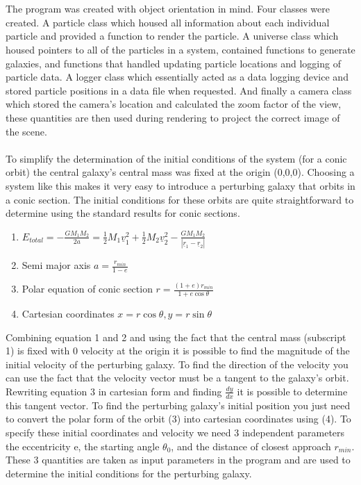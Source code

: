 \documentclass[10pt,a4paper]{article}
\begin{document}
\\
\\
The program was created with object orientation in mind. Four classes were created. A particle class which housed all information about each individual particle and provided a function to render the particle. A universe class which housed pointers to all of the particles in a system, contained functions to generate galaxies, and functions that handled updating particle locations and logging of particle data. A logger class which essentially acted as a data logging device and stored particle positions in a data file when requested. And finally a camera class which stored the camera's location and calculated the zoom factor of the view, these quantities are then used during rendering to project the correct image of the scene.
\\
\\
To simplify the determination of the initial conditions of the system (for a conic orbit) the central galaxy's central mass was fixed at the origin (0,0,0). Choosing a system like this makes it very easy to introduce a perturbing galaxy that orbits in a conic section. The initial conditions for these orbits are quite straightforward to determine using the standard results for conic sections.

\begin{enumerate}
\item $E_{total} = -\frac{G M_1 M_2}{2 a} =\frac{1}{2} M_1 \underline{v}_1^2 + \frac{1}{2} M_2 \underline{v}_2^2 -\frac{G M_1 M_2}{|\underline{r}_1-\underline{r}_2|}$
\item Semi major axis $a = \frac{r_{min}}{1-e}$
\item Polar equation of conic section $r = \frac{(1+e)r_{min}}{1+e\cos{\theta}}$
\item Cartesian coordinates $x=r\cos{\theta},y=r\sin{\theta}$
\end{enumerate}

Combining equation 1 and 2 and using the fact that the central mass (subscript 1) is fixed with 0 velocity at the origin it is possible to find the magnitude of the initial velocity of the perturbing galaxy. To find the direction of the velocity you can use the fact that the velocity vector must be a tangent to the galaxy's orbit. Rewriting equation 3 in cartesian form and finding $\frac{dy}{dx}$ it is possible to determine this tangent vector. To find the perturbing galaxy's initial position you just need to convert the polar form of the orbit (3) into cartesian coordinates using (4). To specify these initial coordinates and velocity we need 3 independent parameters the eccentricity e, the starting angle $\theta_0$, and the distance of closest approach $r_{min}$. These 3 quantities are taken as input parameters in the program and are used to determine the initial conditions for the perturbing galaxy.
\end{document}
